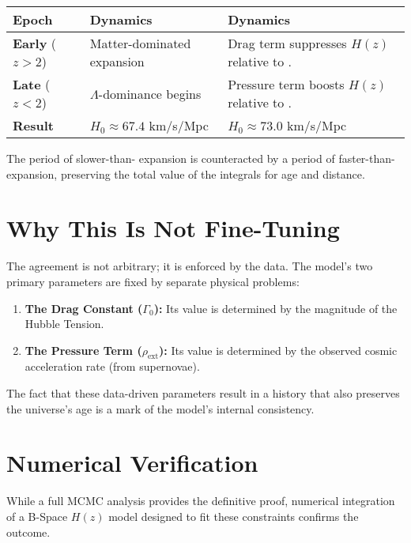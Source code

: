 \documentclass{BSpacePaper} %
\begin{document}
\begin{center}
    \captionsetup{type=table}
    \label{tab:rebalancing}
    \begin{tabular}{@{}lll@{}}
    \toprule
    \textbf{Epoch} & \textbf{\lcdm{} Dynamics} & \textbf{\bspace{} Dynamics} \\ \midrule
    \textbf{Early} ($z > 2$) & Matter-dominated expansion & Drag term suppresses $H(z)$ relative to \lcdm{}. \\
    \textbf{Late} ($z < 2$) & \(\Lambda\)-dominance begins & Pressure term boosts $H(z)$ relative to \lcdm{}. \\ 
    \textbf{Result} & $H_0 \approx 67.4$ km/s/Mpc & $H_0 \approx 73.0$ km/s/Mpc \\ \bottomrule
    \end{tabular}
\end{center}

The period of slower-than-\lcdm{} expansion is counteracted by a period of faster-than-\lcdm{} expansion, preserving the total value of the integrals for age and distance.

\section{Why This Is Not Fine-Tuning}
The agreement is not arbitrary; it is enforced by the data. The model's two primary parameters are fixed by separate physical problems:
\begin{enumerate}
    \item \textbf{The Drag Constant ($\Gamma_0$):} Its value is determined by the magnitude of the Hubble Tension.
    \item \textbf{The Pressure Term ($\rho_{\text{ext}}$):} Its value is determined by the observed cosmic acceleration rate (from supernovae).
\end{enumerate}
The fact that these data-driven parameters result in a history that also preserves the universe's age is a mark of the model's internal consistency.

\section{Numerical Verification}
While a full MCMC analysis provides the definitive proof, numerical integration of a B-Space $H(z)$ model designed to fit these constraints confirms the outcome.
\end{document}
